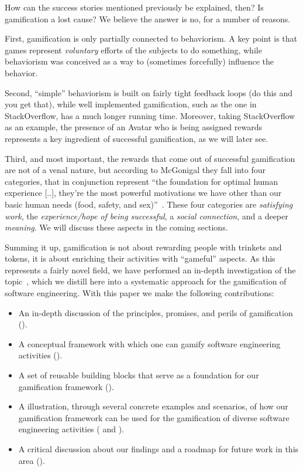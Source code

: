 How can the success stories mentioned previously be explained, then? Is gamification a lost cause? We believe the answer is no, for a number of reasons.

First, gamification is only partially connected to behaviorism.
A key point is that games represent \emph{voluntary} efforts of the subjects to do something, while behaviorism was conceived as a way to (sometimes forcefully) influence the behavior.

Second, ``simple'' behaviorism is built on fairly tight feedback loops (do this and you get that), while well implemented gamification, such as the one in StackOverflow, has a much longer running time.
Moreover, taking StackOverflow as an example, the presence of an Avatar who is being assigned rewards represents a key ingredient of successful gamification, as we will later see.

Third, and most important, the rewards that come out of successful gamification are not of a venal nature, but according to McGonigal they fall into four categories, that in conjunction represent ``the foundation for optimal human experience [..], they're the most powerful motivations we have other than our basic human needs (food, safety, and sex)''~\cite{McGo2011a}.
These four categories are \emph{satisfying work}, the \emph{experience/hope of being successful}, a \emph{social connection}, and a deeper \emph{meaning}.
We will discuss these aspects in the coming sections.

Summing it up, gamification is not about rewarding people with trinkets and tokens, it is about enriching their activities with ``gameful'' aspects.
As this represents a fairly novel field, we have performed an in-depth investigation of the topic~\cite{Mast2014a}, which we distill here into a systematic approach for the gamification of software engineering.
With this paper we make the following contributions:

\begin{itemize}

\item An in-depth discussion of the principles, promises, and perils of gamification ().

\item A conceptual framework with which one can gamify software engineering activities ().

\item A set of reusable building blocks that serve as a foundation for our gamification framework ().

\item A illustration, through several concrete examples and scenarios, of how our gamification framework can be used for the gamification of diverse software engineering activities ( and ).

\item A critical discussion about our findings and a roadmap for future work in this area ().

\end{itemize}


